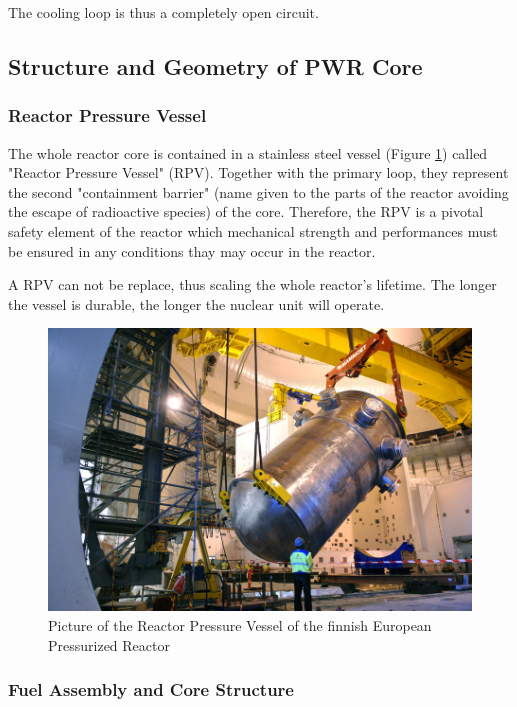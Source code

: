The cooling loop is thus a completely open circuit.


\subsection{Structure and Geometry of PWR Core}


\subsubsection{Reactor Pressure Vessel}

The whole reactor core is contained in a stainless steel vessel (Figure \ref{fig:vessel_pic}) called "Reactor Pressure Vessel" (RPV). Together with the primary loop, they represent the second "containment barrier" (name given to the parts of the reactor avoiding the escape of radioactive species) of the core. Therefore, the RPV is a pivotal safety element of the reactor which mechanical strength and performances must be ensured in any conditions thay may occur in the reactor.

\begin{note*}{}
A RPV can not be replace, thus scaling the whole reactor's lifetime. The longer the vessel is durable, the longer the nuclear unit will operate.
\end{note*}




\begin{figure}[!h]
\centering
\includegraphics[width=0.6\linewidth]{img/intro/vessel_pic.jpg}
\caption{Picture of the Reactor Pressure Vessel of the finnish European Pressurized Reactor \cite{usine_nouvelle_areva}}
\label{fig:vessel_pic}
\end{figure}

\npar


\subsubsection{Fuel Assembly and Core Structure}

